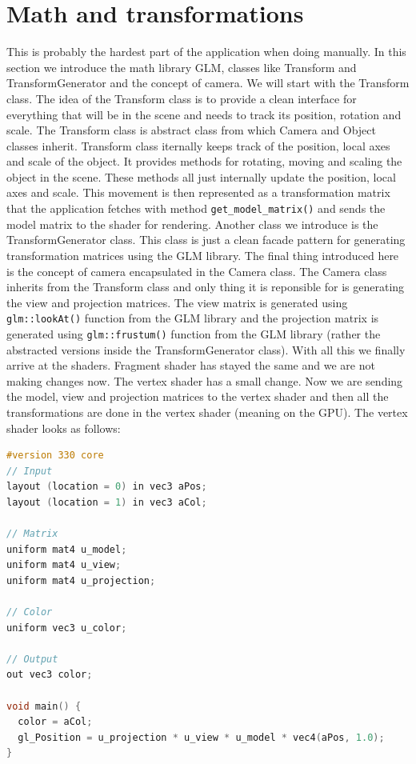 \documentclass[11pt,a4paper]{article}
\begin{document}
\section{Math and transformations}
This is probably the hardest part of the application when doing
manually. In this section we introduce the math library GLM,
classes like Transform and TransformGenerator and the concept of
camera. We will start with the Transform class. The idea
of the Transform class is to provide a clean interface for
everything that will be in the scene and needs to track its position,
rotation and scale. The Transform class is abstract class from which
Camera and Object classes inherit. Transform class iternally keeps
track of the position, local axes and scale of the object. It provides
methods for rotating, moving and scaling the object in the scene.
These methods all just internally update the position, local axes
and scale. This movement is then represented as a transformation
matrix that the application fetches with method
\texttt{get\_model\_matrix()} and sends the model matrix to the shader
for rendering.
Another class we introduce is the TransformGenerator class. This
class is just a clean facade pattern for generating transformation
matrices using the GLM library.
The final thing introduced here is the concept of camera encapsulated
in the Camera class. The Camera class inherits from the Transform class
and only thing it is reponsible for is generating the view and
projection matrices. The view matrix is generated using
\texttt{glm::lookAt()} function from the GLM library
and the projection matrix is generated using \texttt{glm::frustum()}
function from the GLM library (rather the abstracted versions inside
the TransformGenerator class).
With all this we finally arrive at the shaders. Fragment shader
has stayed the same and we are not making changes now. The vertex shader
has a small change. Now we are sending the model, view and
projection matrices to the vertex shader and then all the transformations
are done in the vertex shader (meaning on the GPU). The vertex shader
looks as follows:
\begin{lstlisting}[language=C, caption=Vertex shader example]
#version 330 core
// Input
layout (location = 0) in vec3 aPos;
layout (location = 1) in vec3 aCol;

// Matrix
uniform mat4 u_model;
uniform mat4 u_view;
uniform mat4 u_projection;

// Color
uniform vec3 u_color;

// Output
out vec3 color;

void main() {
  color = aCol;
  gl_Position = u_projection * u_view * u_model * vec4(aPos, 1.0);
}
\end{lstlisting}
\end{document}
